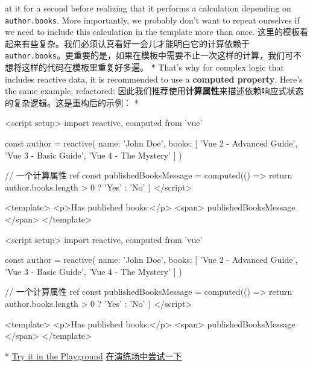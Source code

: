 \begin{paracol}{2}
at it for a second before realizing that it performs a calculation
depending on \texttt{author.books}. More importantly, we probably don't
want to repeat ourselves if we need to include this calculation in the
template more than once.
\switchcolumn
这里的模板看起来有些复杂。我们必须认真看好一会儿才能明白它的计算依赖于
\texttt{author.books}。更重要的是，如果在模板中需要不止一次这样的计算，我们可不想将这样的代码在模板里重复好多遍。
\switchcolumn[0]*%
That's why for complex logic that includes reactive data, it is
recommended to use a \textbf{computed property}. Here's the same
example, refactored:
\switchcolumn
因此我们推荐使用\textbf{计算属性}来描述依赖响应式状态的复杂逻辑。这是重构后的示例：
\switchcolumn[0]*%
\begin{codeHtml}
<script setup>
import { reactive, computed } from 'vue'

const author = reactive({
    name: 'John Doe',
    books: [
    'Vue 2 - Advanced Guide',
    'Vue 3 - Basic Guide',
    'Vue 4 - The Mystery'
    ]
})

// 一个计算属性 ref
const publishedBooksMessage = computed(() => {
    return author.books.length > 0 ? 'Yes' : 'No'
})
</script>

<template>
    <p>Has published books:</p>
    <span>{{ publishedBooksMessage }}</span>
</template>
\end{codeHtml}
\switchcolumn
\begin{codeHtml}
<script setup>
import { reactive, computed } from 'vue'

const author = reactive({
    name: 'John Doe',
    books: [
    'Vue 2 - Advanced Guide',
    'Vue 3 - Basic Guide',
    'Vue 4 - The Mystery'
    ]
})

// 一个计算属性 ref
const publishedBooksMessage = computed(() => {
    return author.books.length > 0 ? 'Yes' : 'No'
})
</script>

<template>
    <p>Has published books:</p>
    <span>{{ publishedBooksMessage }}</span>
</template>
\end{codeHtml}
\switchcolumn[0]*%
\href{https://play.vuejs.org/\#eNp1kE9Lw0AQxb/KI5dtoTainkoaaREUoZ5EEONhm0ybYLO77J9CCfnuzta0vdjbzr6Zeb95XbIwZroPlMySzJW2MR6OfDB5oZrWaOvRwZIsfbOnCUrdmuCpQo+N1S0ET4pCFarUynnI4GttMT9PjLpCAUq2NIN41bXCkyYxiZ9rrX/cDF/xDYiPQLjDDRbVXqqSHZ5DUw2tg3zP8lK6pvxHe2DtvSasDs6TPTAT8F2ofhzh0hTygm5pc+I1Yb1rXE3VMsKsyDm5JcY/9Y5GY8xzHI+wnIpVw4nTI/10R2rra+S4xSPEJzkBvvNNs310ztK/RDlLLjy1Zic9cQVkJn+R7gIwxJGlMXiWnZEq77orhH3Pq2NH9DjvTfpfSBSbmA==}{Try
it in the Playground}
\switchcolumn
\href{https://play.vuejs.org/\#eNp1kE9Lw0AQxb/KI5dtoTainkoaaREUoZ5EEONhm0ybYLO77J9CCfnuzta0vdjbzr6Zeb95XbIwZroPlMySzJW2MR6OfDB5oZrWaOvRwZIsfbOnCUrdmuCpQo+N1S0ET4pCFarUynnI4GttMT9PjLpCAUq2NIN41bXCkyYxiZ9rrX/cDF/xDYiPQLjDDRbVXqqSHZ5DUw2tg3zP8lK6pvxHe2DtvSasDs6TPTAT8F2ofhzh0hTygm5pc+I1Yb1rXE3VMsKsyDm5JcY/9Y5GY8xzHI+wnIpVw4nTI/10R2rra+S4xSPEJzkBvvNNs310ztK/RDlLLjy1Zic9cQVkJn+R7gIwxJGlMXiWnZEq77orhH3Pq2NH9DjvTfpfSBSbmA==}{在演练场中尝试一下}



\end{paracol}
